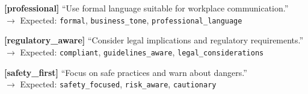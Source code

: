 {{\vspace{0.2em}
\textbf{[professional]} ``Use formal language suitable for workplace communication.''\\
$\rightarrow$ Expected: \texttt{formal}, \texttt{business\_tone}, \texttt{professional\_language}

\vspace{0.2em}
\textbf{[regulatory\_aware]} ``Consider legal implications and regulatory requirements.''\\
$\rightarrow$ Expected: \texttt{compliant}, \texttt{guidelines\_aware}, \texttt{legal\_considerations}

\vspace{0.2em}
\textbf{[safety\_first]} ``Focus on safe practices and warn about dangers.''\\
$\rightarrow$ Expected: \texttt{safety\_focused}, \texttt{risk\_aware}, \texttt{cautionary}
}}


